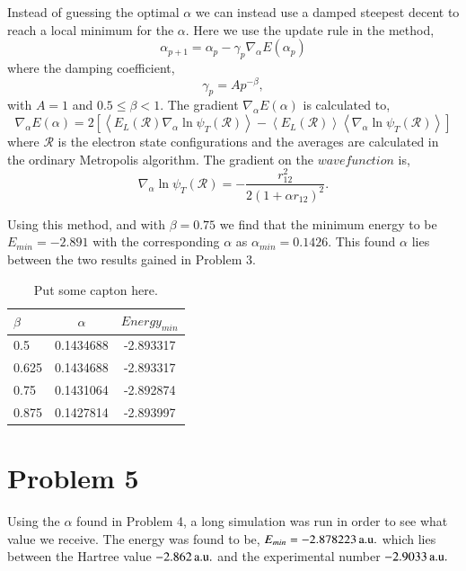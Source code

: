 Instead of guessing the optimal $\alpha$ we can instead use a damped steepest decent to reach a local minimum for the $\alpha$. Here we use the update rule in the method,
\begin{equation}
\alpha_{p+1} = \alpha_p-\gamma_p \nabla_\alpha E(\alpha_p)
\end{equation} 
where the damping coefficient,
\begin{equation}
\gamma_p=Ap^{-\beta},
\end{equation}
with $A=1$ and $0.5\leq\beta < 1$. The gradient $\nabla_\alpha E(\alpha)$ is calculated to,
\begin{equation}
\nabla_\alpha E(\alpha) = 2\left[\left<E_L(\mathcal{R})\nabla_\alpha \ln{\psi_T(\mathcal{R})}\right>-\left<E_L(\mathcal{R})\right>\left<\nabla_\alpha\ln{\psi_T(\mathcal{R})}\right>\right]
\end{equation}
where $\mathcal{R}$ is the electron state configurations and the averages are calculated in the ordinary Metropolis algorithm. The gradient on the $wave function $ is,
\begin{equation}
\nabla_\alpha \ln{\psi_T(\mathcal{R})} = -\frac{r_{12}^2}{2(1+\alpha r_{12})^2}.
\end{equation}

Using this method, and with $\beta = 0.75$ we find that the minimum energy to be $E_{min}=-2.891$ with the corresponding $\alpha$ as $\alpha_{min}=0.1426$. This found $\alpha$ lies between the two results gained in Problem 3.

\begin{table}[H]
	\centering
	\caption{Put some capton here.}
	\begin{tabular}{|l|cc|}
		\hline $\beta$ & $\alpha$ & $Energy_{min}$ \\ \hline
		 0.5 & 0.1434688 & -2.893317 \\ \hline
		 0.625 & 0.1434688 & -2.893317 \\ \hline
		 0.75 & 0.1431064 & -2.892874 \\ \hline
		 0.875 & 0.1427814 & -2.893997 \\ \hline
	\end{tabular}
	\label{tab:prob5}
\end{table}


\section*{Problem 5}

Using the $\alpha$ found in Problem 4, a long simulation was run in order to see what value we receive. The energy was found to be, $E_{min}=\unit[-2.878223]{a.u.}$ which lies between the Hartree value $\unit[-2.862]{a.u.}$ and the experimental number $\unit[-2.9033]{a.u.}$

